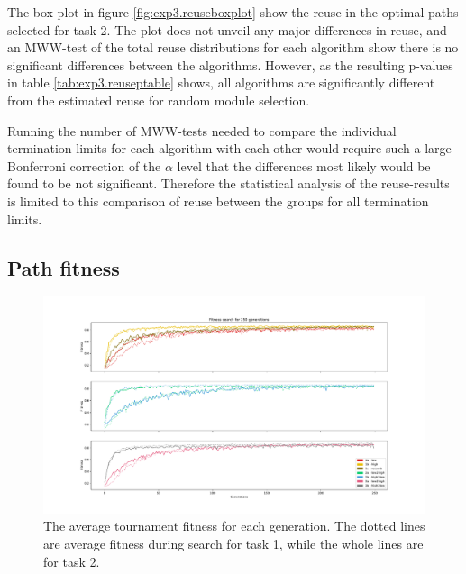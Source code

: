 The box-plot in figure \ref{fig:exp3.reuseboxplot} show the reuse in the optimal paths selected for task 2. The plot does not unveil any major differences in reuse, and an MWW-test of the total reuse distributions for each algorithm show there is no significant differences between the algorithms. However, as the resulting p-values in table \ref{tab:exp3.reuseptable} shows, all algorithms are significantly different from the estimated reuse for random module selection. 

Running the number of MWW-tests needed to compare the individual termination limits for each algorithm with each other would require such a large Bonferroni correction of the \(\alpha\) level that the differences most likely would be found to be not significant. Therefore the statistical analysis of the reuse-results is limited to this comparison of reuse between the groups for all termination limits.

\subsection{Path fitness}
\begin{figure}
    \includegraphics[width=1.25\textwidth, center]{Chapters/4.Experiments/exp3/figures/fitness_progression.pdf}
    \caption[Changes in average tournament fitness]{The average tournament fitness for each generation. The dotted lines are average fitness during search for task 1, while the whole lines are for task 2.}
    \label{fig:exp3.fitness}
\end{figure}

